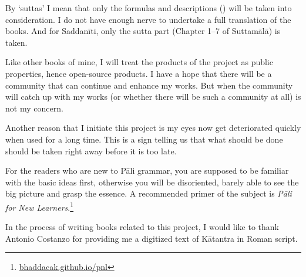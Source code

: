 By `suttas' I mean that only the formulas and descriptions () will be taken into consideration. I do not have enough nerve to undertake a full translation of the books. And for Saddanīti, only the sutta part (Chapter 1--7 of Suttamālā) is taken.

Like other books of mine, I will treat the products of the project as public properties, hence open-source products. I have a hope that there will be a community that can continue and enhance my works. But when the community will catch up with my works (or whether there will be such a community at all) is not my concern.

Another reason that I initiate this project is my eyes now get deteriorated quickly when used for a long time. This is a sign telling us that what should be done should be taken right away before it is too late.

For the readers who are new to Pāli grammar, you are supposed to be familiar with the basic ideas first, otherwise you will be disoriented, barely able to see the big picture and grasp the essence. A recommended primer of the subject is \emph{Pāli for New Learners}.\footnote{\url{bhaddacak.github.io/pnl}}

In the process of writing books related to this project, I would like to thank Antonio Costanzo for providing me a digitized text of Kātantra in Roman script.
